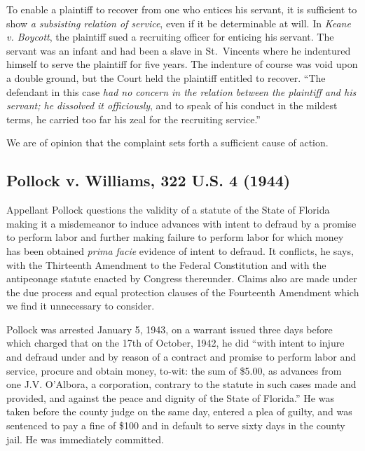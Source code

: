 \documentclass[
  letterpaper,
  11pt,
  DIV=9,
  openright]{scrbook}
\begin{document}
To enable a plaintiff to recover from one who entices his servant, it is
sufficient to show \emph{a subsisting relation of service}, even if it
be determinable at will. In \emph{Keane v. Boycott}, the plaintiff sued
a recruiting officer for enticing his servant. The servant was an infant
and had been a slave in St.~Vincents where he indentured himself to
serve the plaintiff for five years. The indenture of course was void
upon a double ground, but the Court held the plaintiff entitled to
recover. ``The defendant in this case \emph{had no concern in the
relation between the plaintiff and his servant; he dissolved it
officiously}, and to speak of his conduct in the mildest terms, he
carried too far his zeal for the recruiting service.''

We are of opinion that the complaint sets forth a sufficient cause of
action.

\subsection{Pollock v. Williams, 322 U.S. 4
(1944)}\label{pollock-v.-williams-322-u.s.-4-1944}

Appellant Pollock questions the validity of a statute of the State of
Florida making it a misdemeanor to induce advances with intent to
defraud by a promise to perform labor and further making failure to
perform labor for which money has been obtained \emph{prima facie}
evidence of intent to defraud. It conflicts, he says, with the
Thirteenth Amendment to the Federal Constitution and with the
antipeonage statute enacted by Congress thereunder. Claims also are made
under the due process and equal protection clauses of the Fourteenth
Amendment which we find it unnecessary to consider.

Pollock was arrested January 5, 1943, on a warrant issued three days
before which charged that on the 17th of October, 1942, he did ``with
intent to injure and defraud under and by reason of a contract and
promise to perform labor and service, procure and obtain money, to-wit:
the sum of \$5.00, as advances from one J.V. O'Albora, a corporation,
contrary to the statute in such cases made and provided, and against the
peace and dignity of the State of Florida.'' He was taken before the
county judge on the same day, entered a plea of guilty, and was
sentenced to pay a fine of \$100 and in default to serve sixty days in
the county jail. He was immediately committed.
\end{document}
